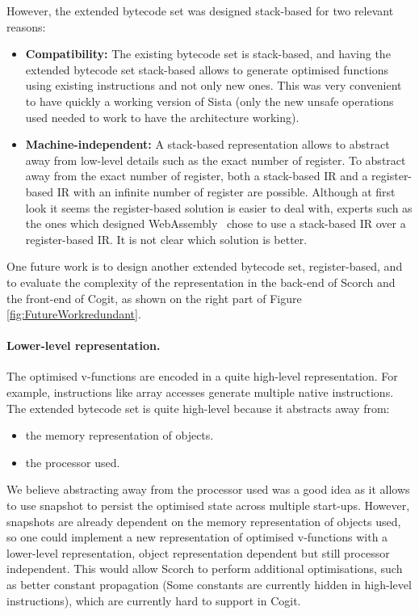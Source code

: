 \documentclass[a4paper,12pt,twoside]{../includes/ThesisStyle}
\begin{document}
However, the extended bytecode set was designed stack-based for two relevant reasons:
\begin{itemize}
	\item \textbf{Compatibility:} The existing bytecode set is stack-based, and having the extended bytecode set stack-based allows to generate optimised functions using existing instructions and not only new ones. This was very convenient to have quickly a working version of Sista (only the new unsafe operations used needed to work to have the architecture working).
	\item \textbf{Machine-independent:} A stack-based representation allows to abstract away from low-level details such as the exact number of register. To abstract away from the exact number of register, both a stack-based IR and a register-based IR with an infinite number of register are possible. Although at first look it seems the register-based solution is easier to deal with, experts such as the ones which designed WebAssembly~\cite{WebAssembly} chose to use a stack-based IR over a register-based IR. It is not clear which solution is better.
\end{itemize}	 

One future work is to design another extended bytecode set, register-based, and to evaluate the complexity of the representation in the back-end of Scorch and the front-end of Cogit, as shown on the right part of Figure \ref{fig:FutureWorkredundant}.

\paragraph{Lower-level representation.}The optimised v-functions are encoded in a quite high-level representation. For example, instructions like array accesses generate multiple native instructions. The extended bytecode set is quite high-level because it abstracts away from:
\begin{itemize}
	\item the memory representation of objects.
	\item the processor used.
\end{itemize}

We believe abstracting away from the processor used was a good idea as it allows to use snapshot to persist the optimised state across multiple start-ups. However, snapshots are already dependent on the memory representation of objects used, so one could implement a new representation of optimised v-functions with a lower-level representation, object representation dependent but still processor independent. This would allow Scorch to perform additional optimisations, such as better constant propagation (Some constants are currently hidden in high-level instructions), which are currently hard to support in Cogit.
\end{document}
